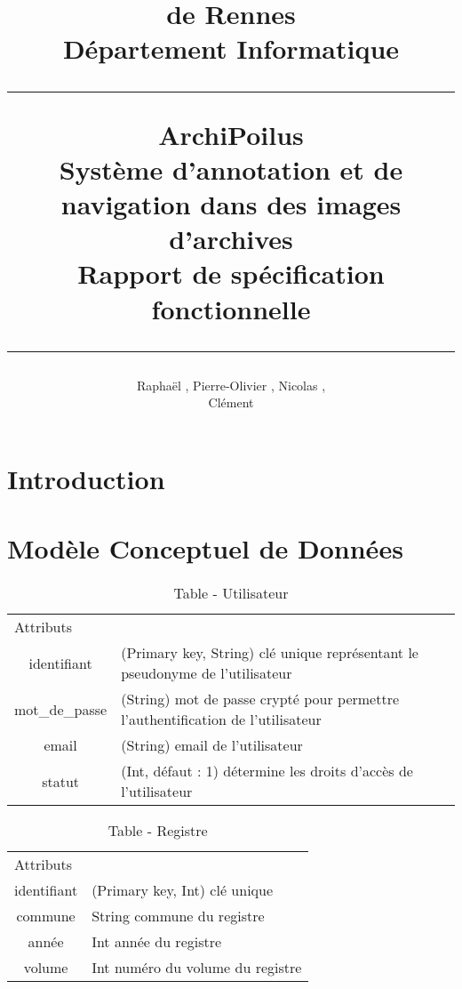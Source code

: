 \documentclass[a4paper]{article}
\title{\bsc{INSA} de Rennes \\ Département Informatique \\ \bigskip \hrule \bigskip ArchiPoilus \\ \bigskip Système d'annotation et de navigation dans des images d'archives \\ \bigskip Rapport de spécification fonctionnelle \bigskip \hrule}
\author{Raphaël \bsc{Baron}, Pierre-Olivier \bsc{Bouteau}, Nicolas \bsc{Charpentier}, \\ Clément \bsc{Leboullenger}}
\begin{document}
\maketitle
\thispagestyle{empty}

\newpage
\tableofcontents
\thispagestyle{empty}

\newpage
{}
{}
\section*{Introduction}

\section{Modèle Conceptuel de Données}

\begin{table}[H]
  \centering
   \small
	\begin{tabular}{|c|p{12cm}|}
   		\hline
   			\rowcolor{lightgray}\multicolumn{2}{|c|}{\textbf{Table - Utilisateur}} \\
   		\hline
   			\multicolumn{2}{|l|}{Attributs} \\
   		\hline
			identifiant & (Primary key, String) clé unique représentant le pseudonyme de l'utilisateur \\
			mot_de_passe & (String) mot de passe crypté pour permettre l'authentification de l'utilisateur \\
			email & (String) email de l'utilisateur \\
			statut & (Int, défaut : 1) détermine les droits d'accès de l'utilisateur \\
   		\hline
 	\end{tabular}
  \caption{Table - Utilisateur}
  \normalsize
  \label{tab: table_utilisateur}
\end{table}

\begin{table}[H]
  \centering
   \small
	\begin{tabular}{|c|p{12cm}|}
   		\hline
   			\rowcolor{lightgray}\multicolumn{2}{|c|}{\textbf{Table - Registre}} \\
   		\hline
   			\multicolumn{2}{|l|}{Attributs} \\
   		\hline
			identifiant & (Primary key, Int) clé unique \\
			commune & String commune du registre \\
			année & Int année du registre \\
			volume & Int numéro du volume du registre \\
   		\hline
 	\end{tabular}
  \caption{Table - Registre}
  \normalsize
  \label{tab: table_registre}
\end{table}
\end{document}

